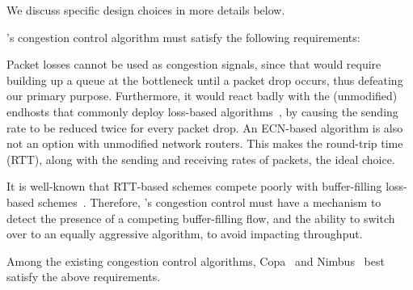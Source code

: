 \vspace{5pt}
\noindent We discuss specific design choices in more details below. 

\name's congestion control algorithm must satisfy the following requirements: 

 Packet losses cannot be used as congestion signals, since that would require building up a queue at the bottleneck until a packet drop occurs, thus defeating our primary purpose. Furthermore, it would react badly with the (unmodified) endhosts that commonly deploy loss-based algorithms~\cite{cubic}, by causing the sending rate to be reduced twice for every packet drop. An ECN-based algorithm is also not an option with unmodified network routers. This makes the round-trip time (RTT), along with the sending and receiving rates of packets, the ideal choice.

 It is well-known that RTT-based schemes compete poorly with buffer-filling loss-based schemes~\cite{nimbus, copa, timely}. Therefore, \name's congestion control must have a mechanism to detect the presence of a competing buffer-filling flow, and the ability to switch over to an equally aggressive algorithm, to avoid impacting throughput. 

Among the existing congestion control algorithms, Copa~\cite{copa} and Nimbus~\cite{nimbus} best satisfy the above requirements.  




